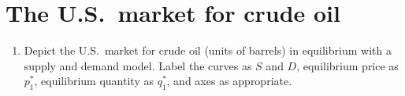 \documentclass[
    letterpaper,paper=portrait,fleqn,
    DIV=16,fontsize=12pt,twoside=semi,
    parskip=full-,
    headings=standardclasses]
{scrartcl}
\begin{document}
\clearpage

\section{The U.S.~market for crude oil}

\begin{enumerate}

\item Depict the U.S.~market for crude oil (units of barrels) in equilibrium with a supply and demand model. Label the curves as $S$ and $D$, equilibrium price as $p^*_1$, equilibrium quantity as $q^*_1$, and axes as appropriate.

\end{enumerate}

\begin{center}
\vspace{18pt}
\end{center}
\end{document}
